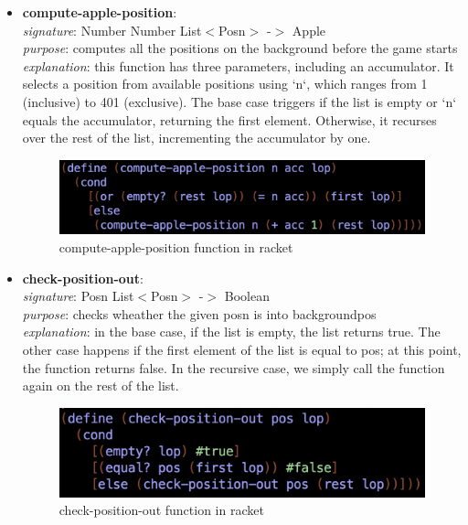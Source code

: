 \documentclass{article}
\begin{document}
\begin{itemize}
		\item \textbf{compute-apple-position}: \\
			\emph{signature}: Number Number List$<$Posn$>$ -$>$ Apple \\
			\emph{purpose}: computes all the positions on the background before the game starts \\
			\emph{explanation}: this function has three parameters, including an accumulator. It selects a position from available positions using `n`, which ranges from 1 (inclusive) to 401 (exclusive). The base case triggers if the list is empty or `n` equals the accumulator, returning the first element. Otherwise, it recurses over the rest of the list, incrementing the accumulator by one.
			\begin{figure}[h!]
				\centering
				\includegraphics[width=.6\linewidth]{compute-apple-position.png}
				\caption{compute-apple-position function in racket}
			\end{figure}
			
		\item \textbf{check-position-out}: \\
			\emph{signature}: Posn List$<$Posn$>$ -$>$ Boolean \\
			\emph{purpose}: checks wheather the given posn is into backgroundpos \\
			\emph{explanation}: in the base case, if the list is empty, the list returns true. 
							The other case happens if the first element of the list is equal to pos; at this point, the function returns 								false.
							In the recursive case, we simply call the function again on the rest of the list.
			\begin{figure}[h!]
				\centering
				\includegraphics[width=.6\linewidth]{check-position-out.png}
				\caption{check-position-out function in racket}
			\end{figure}
			

\end{itemize}
\end{document}
